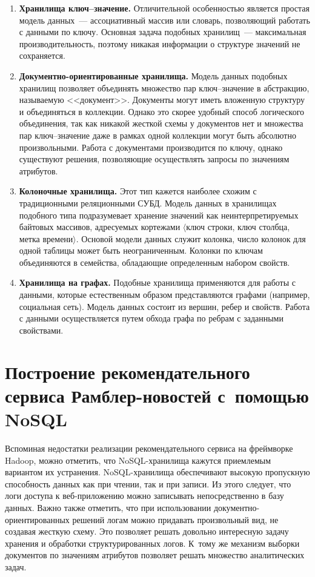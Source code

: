 \begin{multicols}{2}
\noindent
   \begin{enumerate}[1.]
\item \textbf{Хранилища ключ--значение.} Отличительной особенностью 
является простая модель данных~--- ассоциативный массив или словарь, 
поз\-во\-ля\-ющий работать с данными по ключу. \mbox{Основная} \mbox{задача} подобных 
хранилищ~--- максимальная производительность, поэтому никакая 
информации о структуре значений не сохраняется.
\item \textbf{Документно-ориен\-ти\-ро\-ван\-ные хранилища.} Модель 
данных подобных хранилищ позволяет объединять множество пар 
ключ--зна\-че\-ние в абстракцию, называемую <<документ>>. Документы 
могут иметь вложенную структуру и объединяться в коллекции. Однако это 
скорее удобный способ логического объединения, так как никакой жесткой 
схемы у документов нет и множества пар ключ--зна\-че\-ние даже в рамках 
одной коллекции могут быть абсолютно произвольными. Работа с 
документами производится по ключу, однако существуют решения, 
позволяющие осуществлять запросы по значениям атрибутов.
\item \textbf{Колоночные хранилища.} Этот тип кажется наиболее схожим 
с традиционными реляционными СУБД. Модель данных в хранилищах 
подобного типа подразумевает хранение значений как неинтерпретируемых 
байтовых массивов, адресуемых кортежами $\langle$ключ строки, ключ 
столбца, метка времени$\rangle$. Основой модели данных служит колонка, 
число колонок для одной таблицы может быть неограниченным. Колонки по 
ключам объединяются в семейства, обладающие определенным набором 
свойств.
\item \textbf{Хранилища на графах.} Подобные хранилища применяются 
для работы с данными, которые естественным образом представляются 
графами (например, социальная сеть). Модель данных состоит из вершин, 
ребер и свойств. Работа с данными осуществляется путем обхода графа по 
ребрам с заданными свойствами.
\end{enumerate}





\section{Построение рекомендательного сервиса Рамблер-новостей 
с~помощью NoSQL}
   
   Вспоминая недостатки реализации рекомендательного сервиса на 
фреймворке Hadoop, можно отметить, что NoSQL-хра\-ни\-ли\-ща кажутся 
приемлемым вариантом их устранения. NoSQL-хра\-ни\-ли\-ща обеспечивают 
высокую пропускную способность данных как при чтении, так и при записи. Из 
этого следует, что логи доступа к веб-при\-ло\-же\-нию можно записывать 
непосредственно в базу данных. Важно также отметить, что при использовании 
до\-ку\-мент\-но-ориен\-ти\-ро\-ван\-ных решений логам можно придавать 
произвольный вид, не создавая жесткую схему. Это позволяет решать довольно 
интересную задачу хранения и обработки структурированных логов. К~тому же 
механизм выборки документов по значениям атрибутов позволяет решать 
множество аналитических задач.
   

\end{multicols}

